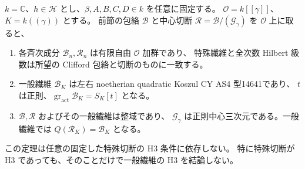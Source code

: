 \begin{theorem}
\label{thm:integrated-formal-as4}
$k=\mathbb C$、$h\in\mathcal H$ とし、$\beta,A,B,C,D\in k$ を任意に固定する。
$\mathcal O=k[[\gamma]]$、$K=k((\gamma))$ とする。
前節の包絡 $\mathcal B$ と中心切断
$\mathcal R=\mathcal B/(\mathcal G_\gamma)$ を $\mathcal O$ 上に取ると、
\begin{enumerate}
\item 各斉次成分 $\mathcal B_n,\mathcal R_n$ は有限自由 $\mathcal O$ 加群であり、
特殊繊維と全次数 Hilbert 級数は所望の Clifford 包絡と切断のものに一致する。
\item 一般繊維 $\mathcal B_K$ は左右 noetherian quadratic Koszul CY AS4 型14641であり、
$t$ は正則、$\operatorname{gr}_{\mathrm{act}}\mathcal B_K=S_K[t]$ となる。
\item $\mathcal B,\mathcal R$ およびその一般繊維は整域であり、
$\mathcal G_\gamma$ は正則中心三次元である。一般繊維では
$Q(\mathcal R_K)=\mathcal B_K$ となる。
\end{enumerate}
この定理は任意の固定した特殊切断の H3 条件に依存しない。
特に特殊切断が H3 であっても、そのことだけで一般繊維の H3 を結論しない。
\end{theorem}
